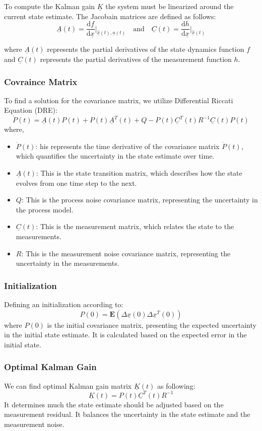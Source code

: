 To compute the Kalman gain $\underline{K}$ the system must be linearized around the current state estimate. The Jacobain matrices are defined as follows:
$$
\underline{A}(t) = \frac{\mathrm{d}f}{\mathrm{d}\underline{x}} \bigg|_{\underline{\hat{x}}(t), \underline{u}(t)} \quad \text{and} \quad
\underline{C}(t) = \frac{\mathrm{d}h}{\mathrm{d}\underline{x}} \bigg|_{\underline{\hat{x}}(t)}
$$

where $\underline{A}(t)$ represents the partial derivatives of the state dynamics function $f$ and $\underline{C}(t)$ represents the partial derivatives of the measurement function $h$.

\subsubsection{Covraince Matrix}
To find a solution for the covariance matrix, we utilize Differential Riccati Equation (DRE):
$$
\dot{P}(t) = \underline{A}(t) P(t) + P(t) \underline{A}^T(t) + Q - P(t) \underline{C}^T(t) R^{-1} \underline{C}(t) P(t)
$$
where, 
\begin{itemize}
	\item $\dot{P}(t)$: his represents the time derivative of the covariance matrix $\dot{P}(t)$, which quantifies the uncertainty in the state estimate over time.
	\item $\underline{A}(t)$: This is the state transition matrix, which describes how the state evolves from one time step to the next.
	\item $Q$: This is the process noise covariance matrix, representing the uncertainty in the process model.
	\item $\underline{C}(t)$: This is the measurement matrix, which relates the state to the measurements.
	\item $R$: This is the measurement noise covariance matrix, representing the uncertainty in the measurements.
\end{itemize}

\subsubsection{Initialization}
Defining an initialization according to:
$$
P(0) = \mathbf{E}(\Delta\underline{x}(0) \Delta\underline{x}^T(0))
$$
where $P(0)$ is the initial covariance matrix, presenting the expected uncertainty in the initial state estimate. It is calculated based on the expected error in the initial state.

\subsubsection{Optimal Kalman Gain}
We can find optimal Kalman gain matrix $\underline{K}(t)$ as following:
$$
\underline{K}(t) = P(t) \underline{C}^T(t) R^{-1}
$$
It determines much the state estimate should be adjusted based on the measurement residual. It balances the uncertainty in the state estimate and the measurement noise.

